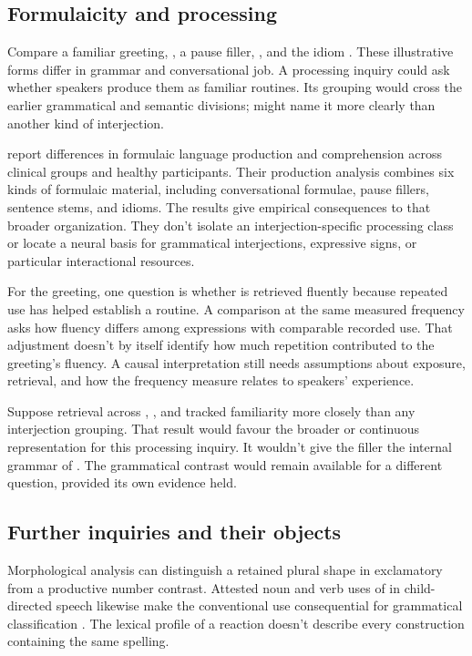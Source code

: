 \documentclass[12pt]{article}
\begin{document}
\subsection{Formulaicity and processing}

Compare a familiar greeting, , a pause filler,
, and the idiom . These illustrative
forms differ in grammar and conversational job. A processing inquiry
could ask whether speakers produce them as familiar routines.
Its grouping would cross the earlier grammatical and semantic divisions;
 might name it more clearly than another
kind of interjection.

\textcite{vanlanckersidtis2015} report differences in formulaic
language production and comprehension across clinical groups and
healthy participants. Their production
analysis combines six kinds of formulaic material, including conversational
formulae, pause fillers, sentence stems, and idioms. The results give
empirical consequences to that broader organization. They don't
isolate an interjection-specific processing class or locate a neural
basis for grammatical interjections, expressive signs, or particular interactional resources.

For the greeting, one question is whether  is
retrieved fluently because repeated use has helped establish a routine.
A comparison at the same measured frequency asks how fluency differs
among expressions with comparable recorded use. That adjustment doesn't
by itself identify how much repetition contributed to the greeting's
fluency. A causal interpretation still needs assumptions about exposure,
retrieval, and how the frequency measure relates to speakers' experience.

Suppose retrieval across , , and
 tracked familiarity more closely than any
interjection grouping. That result would favour the broader or continuous
representation for this processing inquiry. It wouldn't give the filler
 the internal grammar of . The
grammatical contrast would remain available for a different question,
provided its own evidence held.

\subsection{Further inquiries and their objects}

Morphological analysis can distinguish a retained plural shape in
exclamatory  from a productive number contrast. Attested
noun and verb uses of  in child-directed speech likewise
make the conventional use consequential for grammatical classification
\citep[36]{stange2016}. The lexical profile of a reaction doesn't describe
every construction containing the same spelling.
\end{document}

